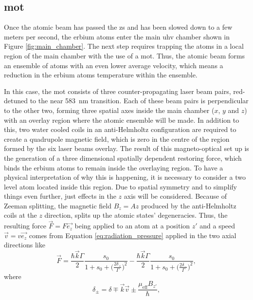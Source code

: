 \subsection{\Acl{mot}}

Once the atomic beam has passed the \ac{zs} and has been slowed down to a few meters per second, the erbium atoms enter the main \ac{uhv} chamber shown in Figure \ref{fig:main_chamber}. The next step requires trapping the atoms in a local region of the main chamber with the use of a \Acf{mot}. Thus, the atomic beam forms an ensemble of atoms with an even lower average velocity, which means a reduction in the erbium atoms temperature within the ensemble. 

In this case, the \ac{mot} consists of three counter-propagating laser beam pairs, red-detuned to the near \SI{583}{\nano\meter} transition. Each of these beam pairs is perpendicular to the other two, forming three spatial axes inside the main chamber ($x$, $y$ and $z$) with an overlay region where the atomic ensemble will be made. In addition to this, two water cooled coils in an anti-Helmholtz configuration are required to create a quadrupole magnetic field, which is zero in the centre of the region formed by the six laser beams overlay. The result of this magneto-optical set up is the generation of a three dimensional spatially dependent restoring force, which binds the erbium atoms to remain inside the overlaying region. To have a physical interpretation of why this is happening, it is necessary to consider a two level atom located inside this region. Due to spatial symmetry and to simplify things even further, just effects in the $z$ axis will be considered. Because of Zeeman splitting, the magnetic field $B_z = A z$ produced by the anti-Helmholtz coils at the $z$ direction, splits up the atomic states' degeneracies. Thus, the resulting force $\vec{F} = F \vec{e_z}$ being applied to an atom at a position $z'$ and a speed $\vec{v} = v \vec{e_z}$ comes from Equation \eqref{eq:radiation_pressure} applied in the two axial directions like
\begin{equation}\label{eq:MOT_force}
	\vec{F} = \frac{\hbar \vec{k} \Gamma}{2} \frac{s_0}{1 + s_0 + \Big(\frac{2\delta_+}{\Gamma}\Big)^2} - \frac{\hbar \vec{k} \Gamma}{2} \frac{s_0}{1 + s_0 + \Big(\frac{2\delta_-}{\Gamma}\Big)^2},
\end{equation}
where
\begin{equation}\label{eq:delta_plus_minus}
	\delta_\pm = \delta \mp \vec{k} \vec{v} \pm \frac{ \mu_{ \text{eff} } B_{z'} }{ \hbar },
\end{equation}
